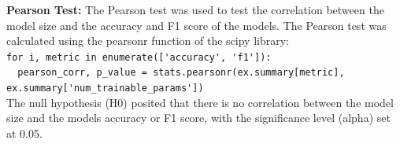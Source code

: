 \textbf{Pearson Test:} The Pearson test was used to test the correlation between the model size and the accuracy
and F1 score of the models. The Pearson test was calculated using the pearsonr function of the scipy library:\\
\lstinline{for i, metric in enumerate(['accuracy', 'f1']):}\\
\lstinline{  pearson_corr, p_value = stats.pearsonr(ex.summary[metric], ex.summary['num_trainable_params'])}\\
The null hypothesis (H0) posited that there is no correlation between the model size and the models 
accuracy or F1 score, with the significance level (alpha) set at 0.05.

